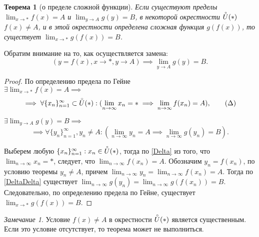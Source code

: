 \documentclass[a4paper,12pt]{article} %
\newtheorem{theorem}{Теорема}[section]
\theoremstyle{remark}
\newtheorem{remark}{Замечание}[theorem]
\theoremstyle{definition}
\begin{document}
\begin{theorem}[о пределе сложной функции]
	Если существуют пределы $\lim_{x \to *} f(x) = A$ и $\lim_{y \to A} g(y) = B$, в некоторой окрестности $\accentset{\circ}{U}(*)$ $f(x)\neq A$, и в этой окрестности определена сложная функция $g(f(x))$, то существует $\lim_{x \to *} g(f(x)) = B$.
\end{theorem}
Обратим внимание на то, как осуществляется замена:
\[
	(y=f(x), x\to *, y \to A) \implies \lim_{y \to A} g(y) = B
.\] 
\begin{proof}
	По определению предела по Гейне \\
	
	$\displaystyle \exists \lim_{x \to *} f(x) = A \implies $
	\begin{equation}\label{Delta}
			\implies \forall \{x_n\}_{n=1}^{\infty} \subset \accentset{\circ}{U}(*) : (\lim_{n \to \infty} x_n = * \implies \lim_{n \to \infty} f(x_n) = A), \tag{$\Delta$} 
	\end{equation}

	$\displaystyle \exists \lim_{y \to A} g(y) = B \implies$
	\begin{equation}\label{DeltaDelta}
			 \implies \forall \{y_n\}_{n=1}^{\infty}, y_{n}\neq A : (\lim_{n \to \infty} y_n = A \implies \lim_{n \to \infty} g(y_{n}) = B). \tag{$\Delta\Delta$} 
	\end{equation}

	Выберем любую $\{x_n\}_{n=1}^{\infty} : x_{n} \in  \accentset{\circ}{U}(*)$, тогда по \eqref{Delta} из того, что $\lim_{n \to \infty} x_n = *$, следует, что $\lim_{n \to \infty} f(x_{n}) = A$. Обозначим $y_{n}=f(x_{n})$, по условию теоремы $y_{n}\neq A$, причем $\lim_{n \to \infty} y_{n} = \lim_{n \to \infty} f(x_{n}) = A$. Тогда по \eqref{DeltaDelta} существует $\lim_{n \to \infty} g(y_{n}) = \lim_{n \to \infty} g(f(x_{n})) = B$. Следовательно, по определению предела по Гейне, существует $\lim_{x \to *} g(f(x)) = B$.
\end{proof}
\begin{remark}
	Условие $f(x)\neq A$ в окрестности $\accentset{\circ}{U}(*)$ является существенным. Если это условие отсутствует, то теорема может не выполниться.
\end{remark}
\end{document}

